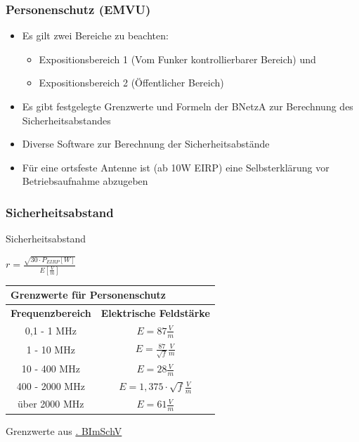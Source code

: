 \begin{frame}
  \frametitle{Personenschutz (EMVU)}
  \begin{itemize}
    \item Es gilt zwei Bereiche zu beachten:
      \begin{itemize}
        \item Expositionsbereich 1 (Vom Funker kontrollierbarer Bereich) und
        \item Expositionsbereich 2 (Öffentlicher Bereich)
      \end{itemize}
    \item Es gibt festgelegte Grenzwerte und Formeln der BNetzA zur Berechnung des Sicherheitsabstandes
    \item Diverse Software zur Berechnung der Sicherheitsabstände
    \item Für eine ortsfeste Antenne ist (ab 10W EIRP) eine Selbsterklärung vor Betriebsaufnahme abzugeben
  \end{itemize}
\end{frame}

\begin{frame}
  \frametitle{Sicherheitsabstand}
  \begin{block}{Sicherheitsabstand}
    \begin{LARGE}
      $r = \frac{\sqrt{30 \cdot P_{EIRP}[W]}}{E[\frac{V}{m}]}$
    \end{LARGE}
  \end{block}
  \vspace{1em}

  \begin{center}
    \begin{tabular}{|c|c|}
      \hline
      \multicolumn{2}{|l|}{\textbf{Grenzwerte für Personenschutz}} \\ \hline
      \textbf{Frequenzbereich} & \textbf{Elektrische Feldstärke} \\ \hline
      0,1 - 1 MHz & $E = 87 \frac{V}{m}$ \\ \hline
      1 - 10 MHz & $E = \frac{87}{\sqrt{f}} \frac{V}{m}$ \\ \hline
      10 - 400 MHz & $E = 28 \frac{V}{m}$ \\ \hline
      400 - 2000 MHz & $E = 1,375 \cdot \sqrt{f} \frac{V}{m}$ \\ \hline
      über 2000 MHz & $E = 61 \frac{V}{m}$ \\ \hline
    \end{tabular}
  \end{center}
  Grenzwerte aus \href{https://www.gesetze-im-internet.de/bimschv\_26/anhang\_1.html}{. BImSchV}
\end{frame}

